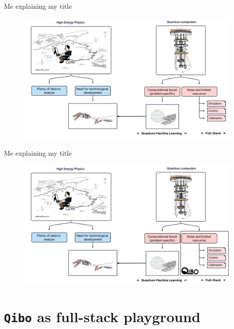 \documentclass[8pt, xcolor={svgnames}, hyperref={linkcolor=black}]{beamer}
\begin{document}
\begin{frame}{Me explaining my title}
\begin{figure}  
    \includegraphics[width=1\textwidth]{figures/meinthecontext.png}
\end{figure}
\end{frame}

\begin{frame}{Me explaining my title}
\begin{figure}  
    \includegraphics[width=1\textwidth]{figures/meandqibo.png}
\end{figure}
\end{frame}

\section{\texttt{Qibo} as full-stack playground}
\end{document}
